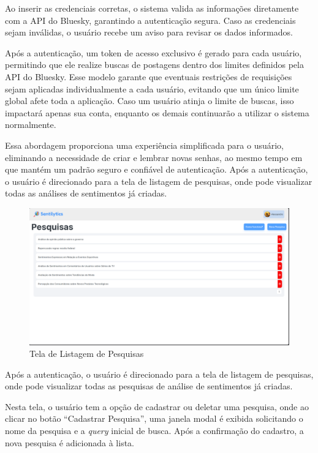 \documentclass[
	12pt,				%
	oneside,			%
	a4paper,			%
	english,			%
	french,				%
	spanish,			%
	brazil				%
	]{abntex2}
\begin{document}
Ao inserir as credenciais corretas, o sistema valida as informações
diretamente com a API do Bluesky, garantindo a autenticação segura. Caso
as credenciais sejam inválidas, o usuário recebe um aviso para revisar
os dados informados.

Após a autenticação, um token de acesso exclusivo é gerado para cada
usuário, permitindo que ele realize buscas de postagens dentro dos
limites definidos pela API do Bluesky. Esse modelo garante que eventuais
restrições de requisições sejam aplicadas individualmente a cada
usuário, evitando que um único limite global afete toda a aplicação.
Caso um usuário atinja o limite de buscas, isso impactará apenas sua
conta, enquanto os demais continuarão a utilizar o sistema normalmente.

Essa abordagem proporciona uma experiência simplificada para o usuário,
eliminando a necessidade de criar e lembrar novas senhas, ao mesmo tempo
em que mantém um padrão seguro e confiável de autenticação. Após a
autenticação, o usuário é direcionado para a tela de listagem de
pesquisas, onde pode visualizar todas as análises de sentimentos já
criadas.

\begin{figure}[htbp]
\hypertarget{tela_listagem_pesquisas}{%
\caption{Tela de Listagem de Pesquisas}\label{tela_listagem_pesquisas}
\begin{center}
\includegraphics[scale=0.2]{imagens/sentilytics/interface-grafica/listagem-pesquisas.png}
\end{center}
}
\end{figure}

Após a autenticação, o usuário é direcionado para a tela de listagem de
pesquisas, onde pode visualizar todas as pesquisas de análise de
sentimentos já criadas.

Nesta tela, o usuário tem a opção de cadastrar ou deletar uma pesquisa,
onde ao clicar no botão ``Cadastrar Pesquisa'', uma janela modal é
exibida solicitando o nome da pesquisa e a \emph{query} inicial de
busca. Após a confirmação do cadastro, a nova pesquisa é adicionada à
lista.
\end{document}
